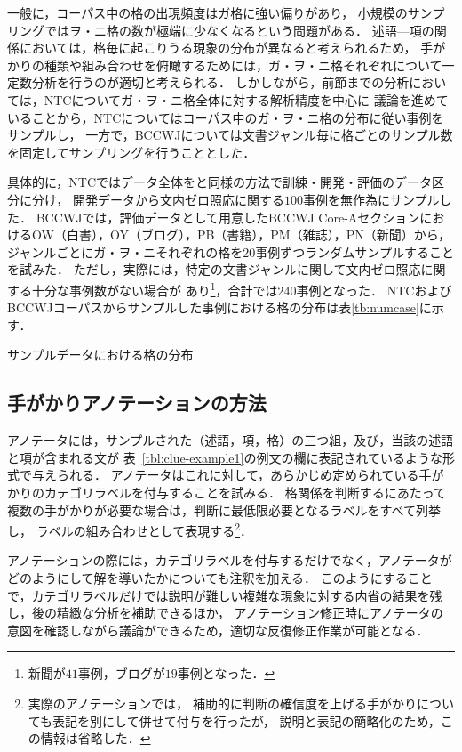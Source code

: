 \documentclass[japanese]{jnlp_1.4}
\begin{document}
一般に，コーパス中の格の出現頻度はガ格に強い偏りがあり，
小規模のサンプリングではヲ・ニ格の数が極端に少なくなるという問題がある．
述語—項の関係においては，格毎に起こりうる現象の分布が異なると考えられるため，
手がかりの種類や組み合わせを俯瞰するためには，ガ・ヲ・ニ格それぞれについて一定数分析を行うのが適切と考えられる．
しかしながら，前節までの分析においては，NTCについてガ・ヲ・ニ格全体に対する解析精度を中心に
議論を進めていることから，NTCについてはコーパス中のガ・ヲ・ニ格の分布に従い事例をサンプルし，
一方で，BCCWJについては文書ジャンル毎に格ごとのサンプル数を固定してサンプリングを行うこととした．

具体的に，NTCではデータ全体をと同様の方法で訓練・開発・評価のデータ区分に分け，
開発データから文内ゼロ照応に関する$100$事例を無作為にサンプルした．
BCCWJでは，評価データとして用意したBCCWJ Core-AセクションにおけるOW（白書），OY（ブログ），PB（書籍），PM（雑誌），PN（新聞）から，
ジャンルごとにガ・ヲ・ニそれぞれの格を$20$事例ずつランダムサンプルすることを試みた．
ただし，実際には，特定の文書ジャンルに関して文内ゼロ照応に関する十分な事例数がない場合が
あり\footnote{新聞が$41$事例，ブログが$19$事例となった．}，合計では$240$事例となった．
NTCおよびBCCWJコーパスからサンプルした事例における格の分布は表\ref{tb:numcase}に示す．

\begin{table}[t]
\caption{サンプルデータにおける格の分布}
\label{tb:numcase}

\end{table}


\subsection{手がかりアノテーションの方法}

アノテータには，サンプルされた（述語，項，格）の三つ組，及び，当該の述語と項が含まれる文が
表~\ref{tbl:clue-example1}の例文の欄に表記されているような形式で与えられる．
アノテータはこれに対して，あらかじめ定められている手がかりのカテゴリラベルを付与することを試みる．
格関係を判断するにあたって複数の手がかりが必要な場合は，判断に最低限必要となるラベルをすべて列挙し，
ラベルの組み合わせとして表現する\footnote{実際のアノテーションでは，
補助的に判断の確信度を上げる手がかりについても表記を別にして併せて付与を行ったが，
説明と表記の簡略化のため，この情報は省略した．}．

アノテーションの際には，カテゴリラベルを付与するだけでなく，アノテータがどのようにして解を導いたかについても注釈を加える．
このようにすることで，カテゴリラベルだけでは説明が難しい複雑な現象に対する内省の結果を残し，後の精緻な分析を補助できるほか，
アノテーション修正時にアノテータの意図を確認しながら議論ができるため，適切な反復修正作業が可能となる．
\end{document}
